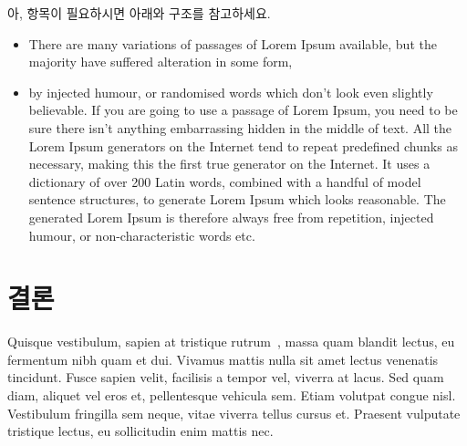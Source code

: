 \documentclass{pnu-survey}
\begin{document}
아, 항목이 필요하시면 아래와 구조를 참고하세요.

\begin{itemize}[itemsep=0pt,parsep=0pt]
  \item There are many variations of passages of Lorem Ipsum available, but the majority have suffered alteration in some form, 
  \item by injected humour, or randomised words which don't look even slightly believable. If you are going to use a passage of Lorem Ipsum, you need to be sure there isn't anything embarrassing hidden in the middle of text. All the Lorem Ipsum generators on the Internet tend to repeat predefined chunks as necessary, making this the first true generator on the Internet. It uses a dictionary of over 200 Latin words, combined with a handful of model sentence structures, to generate Lorem Ipsum which looks reasonable. The generated Lorem Ipsum is therefore always free from repetition, injected humour, or non-characteristic words etc.
\end{itemize}

\section{결론}

Quisque vestibulum, sapien at tristique rutrum~\cite{lsh}, massa quam blandit lectus, eu fermentum nibh quam et dui. Vivamus mattis nulla sit amet lectus venenatis tincidunt. Fusce sapien velit, facilisis a tempor vel, viverra at lacus. Sed quam diam, aliquet vel eros et, pellentesque vehicula sem. Etiam volutpat congue nisl. Vestibulum fringilla sem neque, vitae viverra tellus cursus et. Praesent vulputate tristique lectus, eu sollicitudin enim mattis nec.



\end{document}
